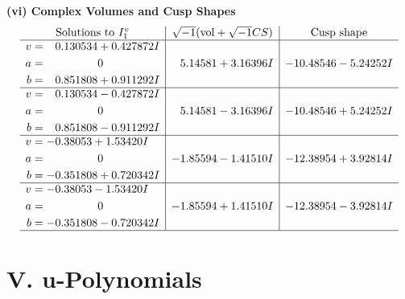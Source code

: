 \documentclass[1p]{elsarticle_modified}
\theoremstyle{definition}
\newcommand{\I}{\sqrt{-1}}
\begin{document}
\newpage\flushleft \textbf{(vi) Complex Volumes and Cusp Shapes}
$$\begin{array}{c|c|c}  
\text{Solutions to }I^v_{1}& \I (\text{vol} + \sqrt{-1}CS) & \text{Cusp shape}\\
 \hline 
\begin{aligned}
v &= \phantom{-}0.130534 + 0.427872 I \\
a &= \phantom{-0.000000 } 0 \\
b &= \phantom{-}0.851808 + 0.911292 I\end{aligned}
 & \phantom{-}5.14581 + 3.16396 I & -10.48546 - 5.24252 I \\ \hline\begin{aligned}
v &= \phantom{-}0.130534 - 0.427872 I \\
a &= \phantom{-0.000000 } 0 \\
b &= \phantom{-}0.851808 - 0.911292 I\end{aligned}
 & \phantom{-}5.14581 - 3.16396 I & -10.48546 + 5.24252 I \\ \hline\begin{aligned}
v &= -0.38053 + 1.53420 I \\
a &= \phantom{-0.000000 } 0 \\
b &= -0.351808 + 0.720342 I\end{aligned}
 & -1.85594 - 1.41510 I & -12.38954 + 3.92814 I \\ \hline\begin{aligned}
v &= -0.38053 - 1.53420 I \\
a &= \phantom{-0.000000 } 0 \\
b &= -0.351808 - 0.720342 I\end{aligned}
 & -1.85594 + 1.41510 I & -12.38954 - 3.92814 I\\
 \hline 
 \end{array}$$\newpage
\newpage\renewcommand{\arraystretch}{1}
\centering \section*{ V. u-Polynomials}
\end{document}
